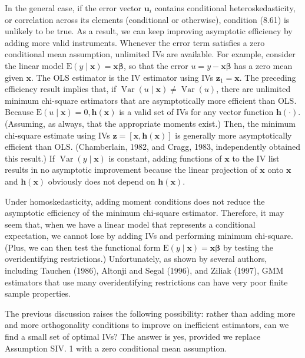 \documentclass[10pt]{article}
\begin{document}
In the general case, if the error vector $\mathbf{u}_{i}$ contains conditional heteroskedasticity, or correlation across its elements (conditional or otherwise), condition (8.61) is unlikely to be true. As a result, we can keep improving asymptotic efficiency by adding more valid instruments. Whenever the error term satisfies a zero conditional mean assumption, unlimited IVs are available. For example, consider the linear model $\mathrm{E}(y \mid \mathbf{x})=\mathbf{x} \boldsymbol{\beta}$, so that the error $u=y-\mathbf{x} \boldsymbol{\beta}$ has a zero mean given $\mathbf{x}$. The OLS estimator is the IV estimator using IVs $\mathbf{z}_{1}=\mathbf{x}$. The preceding efficiency result implies that, if $\operatorname{Var}(u \mid \mathbf{x}) \neq \operatorname{Var}(u)$, there are unlimited minimum chi-square estimators that are asymptotically more efficient than OLS. Because $\mathrm{E}(u \mid \mathbf{x})=0, \mathbf{h}(\mathbf{x})$ is a valid set of IVs for any vector function $\mathbf{h}(\cdot)$. (Assuming, as always, that the appropriate moments exist.) Then, the minimum chi-square estimate using IVs $\mathbf{z}=[\mathbf{x}, \mathbf{h}(\mathbf{x})]$ is generally more asymptotically efficient than OLS. (Chamberlain, 1982, and Cragg, 1983, independently obtained this result.) If $\operatorname{Var}(y \mid \mathbf{x})$ is constant, adding functions of $\mathbf{x}$ to the IV list results in no asymptotic improvement because the linear projection of $\mathbf{x}$ onto $\mathbf{x}$ and $\mathbf{h}(\mathbf{x})$ obviously does not depend on $\mathbf{h}(\mathbf{x})$.

Under homoskedasticity, adding moment conditions does not reduce the asymptotic efficiency of the minimum chi-square estimator. Therefore, it may seem that, when we have a linear model that represents a conditional expectation, we cannot lose by adding IVs and performing minimum chi-square. (Plus, we can then test the functional form $\mathrm{E}(y \mid \mathbf{x})=\mathbf{x} \boldsymbol{\beta}$ by testing the overidentifying restrictions.) Unfortunately, as shown by several authors, including Tauchen (1986), Altonji and Segal (1996), and Ziliak (1997), GMM estimators that use many overidentifying restrictions can have very poor finite sample properties.

The previous discussion raises the following possibility: rather than adding more and more orthogonality conditions to improve on inefficient estimators, can we find a small set of optimal IVs? The answer is yes, provided we replace Assumption SIV. 1 with a zero conditional mean assumption.
\end{document}
